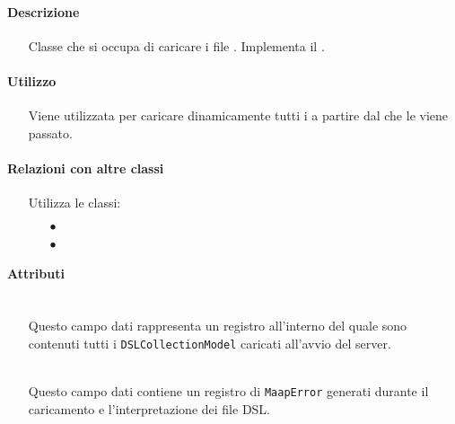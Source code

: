 \paragraph*{Descrizione}
\begin{itemize}
\item[] Classe che si occupa di caricare i file . Implementa il  .
\end{itemize}

\paragraph*{Utilizzo}
\begin{itemize}
\item[] Viene utilizzata per caricare dinamicamente tutti i  a partire dal  che le viene passato.
\end{itemize}

\paragraph*{Relazioni con altre classi}
\begin{itemize}


\item[] Utilizza le classi:
\begin{itemize}
\item[$\bullet$] 
\item[$\bullet$] 
\end{itemize}
\end{itemize}

\paragraph*{Attributi}
\begin{itemize}
\item[]  \\ Questo campo dati rappresenta un registro all'interno del quale sono contenuti tutti i \texttt{DSLCollectionModel} caricati all'avvio del server.
\item[]  \\ Questo campo dati contiene un registro di \texttt{MaapError} generati durante il caricamento e l'interpretazione dei file DSL.
\end{itemize}

